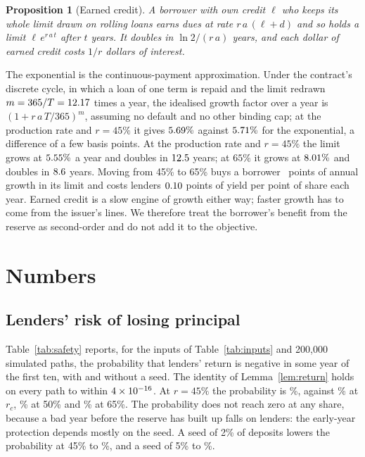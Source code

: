 \documentclass[preprint,11pt,authoryear]{elsarticle}
\newtheorem{proposition}{Proposition}
\theoremstyle{definition}
\begin{document}
\begin{proposition}[Earned credit]\label{prop:growth}
A borrower with own credit $\ell$ who keeps its whole limit drawn on rolling loans earns dues at rate
$r\,a\,(\ell+d)$ and so holds a limit $\ell\,e^{r\,a\,t}$ after $t$ years. It doubles in $\ln 2/(r\,a)$ years, and each
dollar of earned credit costs $1/r$ dollars of interest.
\end{proposition}

The exponential is the continuous-payment approximation. Under the contract's discrete cycle, in which a loan of one
term is repaid and the limit redrawn $m=365/T=12.17$ times a year, the idealised growth factor over a year is
$(1+r\,a\,T/365)^m$, assuming no default and no other binding cap; at the production rate and $r=45\%$ it gives
$5.69\%$ against $5.71\%$ for the exponential, a difference of a few basis points.
At the production rate and $r=45\%$ the limit grows at $5.55\%$ a year and doubles in $12.5$ years; at
$65\%$ it grows at $8.01\%$ and doubles in $8.6$ years. Moving from 45\% to 65\% buys a borrower
\GrowthGain\ points of annual growth in its limit and costs lenders $0.10$ points of yield per point of share each year. Earned credit
is a slow engine of growth either way; faster growth has to come from the issuer's lines. We therefore treat the borrower's
benefit from the reserve as second-order and do not add it to the objective.

\section{Numbers}\label{sec:numbers}

\subsection{Lenders' risk of losing principal}

Table~\ref{tab:safety} reports, for the inputs of Table~\ref{tab:inputs} and 200,000 simulated paths, the probability that
lenders' return is negative in some year of the first ten, with and without a seed. The identity of Lemma~\ref{lem:return}
holds on every path to within $4\times10^{-16}$. At $r=45\%$ the probability is \PTenAtFortyFive\%, against \PTenAtRC\% at $r_c$,
\PTenAtFifty\% at 50\% and \PTenAtSixtyFive\% at 65\%. The probability does not reach zero at any share, because a
bad year before the reserve has built up falls on lenders: the early-year protection depends mostly on the seed. A seed of 2\% of
deposits lowers the probability at 45\% to \PTenAtFortyFiveSeedTwo\%, and a seed of 5\% to \PTenAtFortyFiveSeedFive\%.
\end{document}
